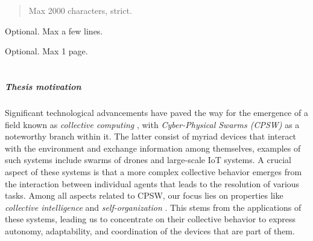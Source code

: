 \documentclass[12pt,a4paper,openright,twoside]{book}
\begin{document}
	
\frontmatter



\begin{abstract}	
Max 2000 characters, strict.
\end{abstract}

\begin{dedication} 
Optional. Max a few lines.
\end{dedication}

\begin{acknowledgements}
Optional. Max 1 page.
\end{acknowledgements}

\tableofcontents   
\listoffigures     
\lstlistoflistings 

\mainmatter

\chapter{\introductionname}
\label{chap:introduction}


\paragraph{Thesis motivation}

Significant technological advancements have paved the way for the emergence of a field known as \emph{collective computing} 
    \cite{abowd2016beyond}, with \emph{Cyber-Physical Swarms (CPSW)} \cite{schranz2021swarm} as a noteworthy branch within it.
    The latter consist of myriad devices that interact with the environment and exchange information among themselves,
    examples of such systems include swarms of drones and large-scale IoT systems.
    A crucial aspect of these systems is that a more complex collective behavior emerges from the interaction between 
    individual agents that leads to the resolution of various tasks.
    Among all aspects related to CPSW, our focus lies on properties like \emph{collective intelligence} \cite{tumer2004survey} 
    and \emph{self-organization} \cite{schmeck2011organic}. This stems from the applications of these systems, leading us to 
    concentrate on their collective behavior to express autonomy, adaptability, and coordination of the devices 
    that are part of them.
\end{document}
